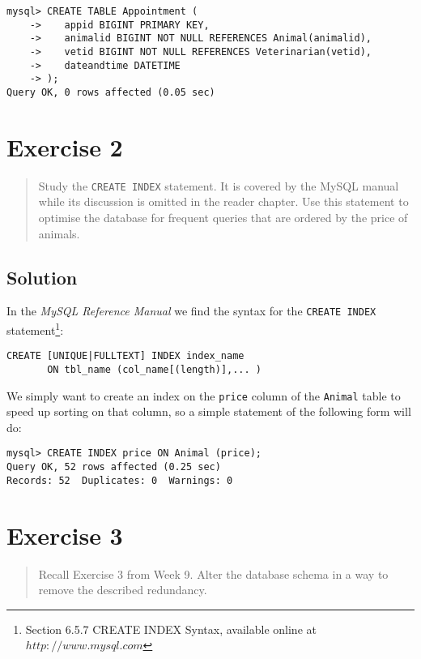 \documentclass[11pt]{article}
\begin{document}
\begin{verbatim}
mysql> CREATE TABLE Appointment (
    ->    appid BIGINT PRIMARY KEY,
    ->    animalid BIGINT NOT NULL REFERENCES Animal(animalid),
    ->    vetid BIGINT NOT NULL REFERENCES Veterinarian(vetid),
    ->    dateandtime DATETIME
    -> );
Query OK, 0 rows affected (0.05 sec)
\end{verbatim}


\newpage

\section{Exercise 2}

\begin{quote}
Study the \verb|CREATE INDEX| statement. It is covered by the MySQL manual while its discussion is omitted in the reader chapter. Use this statement to optimise the database for frequent queries that are ordered by the price of animals.
\end{quote}

\subsection*{Solution}

In the \emph{MySQL Reference Manual} we find the syntax for the \verb|CREATE INDEX| statement\footnote{Section 6.5.7 CREATE INDEX Syntax, available online at $http://www.mysql.com$}:

\begin{verbatim}
CREATE [UNIQUE|FULLTEXT] INDEX index_name
       ON tbl_name (col_name[(length)],... )
\end{verbatim}

We simply want to create an index on the \verb|price| column of the \verb|Animal| table to speed up sorting on that column, so a simple statement of the following form will do:

\begin{verbatim}
mysql> CREATE INDEX price ON Animal (price);
Query OK, 52 rows affected (0.25 sec)
Records: 52  Duplicates: 0  Warnings: 0
\end{verbatim}


\newpage

\section{Exercise 3}

\begin{quote}
Recall Exercise 3 from Week 9. Alter the database schema in a way to remove the described redundancy.
\end{quote}
\end{document}
